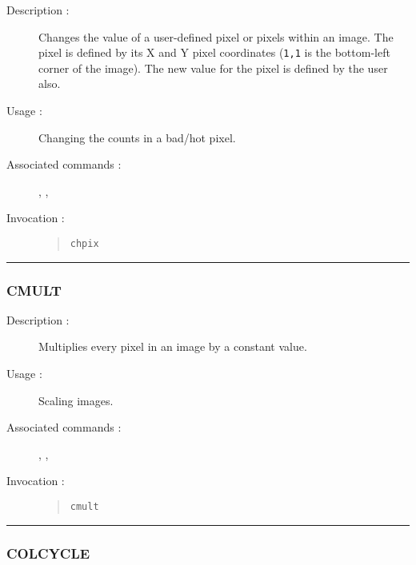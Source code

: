 \begin{description}

\item[Description :] Changes the value of a user-defined
pixel or pixels within an image.  The pixel is defined by its X and Y
pixel coordinates ({\tt 1,1} is the bottom-left corner of the image).
The new value for the pixel is defined by the user also.

\item[Usage :] Changing the counts in a bad/hot pixel.

\item[Associated commands :] {\tt {}},
{\tt {}}, {\tt {}}

\item[Invocation :]

\begin{quote}{\tt  chpix }\end{quote}

\end{description}

\hrule
\subsubsection*{\label{CMULT}CMULT}

\begin{description}

\item[Description :] Multiplies every pixel in an image by a constant value.

\item[Usage :] Scaling images.

\item[Associated commands :] {\tt {}},
{\tt {}}, {\tt {}}

\item[Invocation :]

\begin{quote}{\tt cmult }\end{quote}

\end{description}

\hrule
\subsubsection*{\label{COLCYCLE}COLCYCLE}


